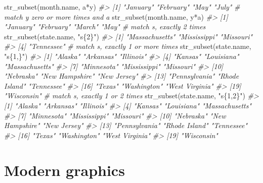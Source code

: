 \documentclass[
]{book}
\newenvironment{Shaded}{\begin{snugshade}}{\end{snugshade}}
\newcommand{\CommentTok}[1]{\textcolor[rgb]{0.56,0.35,0.01}{\textit{#1}}}
\newcommand{\FunctionTok}[1]{\textcolor[rgb]{0.00,0.00,0.00}{#1}}
\newcommand{\NormalTok}[1]{#1}
\newcommand{\StringTok}[1]{\textcolor[rgb]{0.31,0.60,0.02}{#1}}
\begin{document}
\begin{Shaded}
\begin{Highlighting}[]
\FunctionTok{str\_subset}\NormalTok{(month.name, }\StringTok{\textquotesingle{}a*y\textquotesingle{}}\NormalTok{)}
\CommentTok{\#\textgreater{} [1] "January"  "February" "May"      "July"}
\CommentTok{\# match \textquotesingle{}y\textquotesingle{} zero or more times and \textquotesingle{}a\textquotesingle{}}
\FunctionTok{str\_subset}\NormalTok{(month.name, }\StringTok{\textquotesingle{}y*a\textquotesingle{}}\NormalTok{)}
\CommentTok{\#\textgreater{} [1] "January"  "February" "March"    "May"}
\CommentTok{\# match \textquotesingle{}s\textquotesingle{}, exactly 2 times}
\FunctionTok{str\_subset}\NormalTok{(state.name, }\StringTok{"s\{2\}"}\NormalTok{)}
\CommentTok{\#\textgreater{} [1] "Massachusetts" "Mississippi"   "Missouri"     }
\CommentTok{\#\textgreater{} [4] "Tennessee"}
\CommentTok{\# match \textquotesingle{}s\textquotesingle{}, exactly 1 or more times}
\FunctionTok{str\_subset}\NormalTok{(state.name, }\StringTok{"s\{1,\}"}\NormalTok{)}
\CommentTok{\#\textgreater{}  [1] "Alaska"        "Arkansas"      "Illinois"     }
\CommentTok{\#\textgreater{}  [4] "Kansas"        "Louisiana"     "Massachusetts"}
\CommentTok{\#\textgreater{}  [7] "Minnesota"     "Mississippi"   "Missouri"     }
\CommentTok{\#\textgreater{} [10] "Nebraska"      "New Hampshire" "New Jersey"   }
\CommentTok{\#\textgreater{} [13] "Pennsylvania"  "Rhode Island"  "Tennessee"    }
\CommentTok{\#\textgreater{} [16] "Texas"         "Washington"    "West Virginia"}
\CommentTok{\#\textgreater{} [19] "Wisconsin"}
\CommentTok{\# match \textquotesingle{}s\textquotesingle{}, exactly 1 or 2 times}
\FunctionTok{str\_subset}\NormalTok{(state.name, }\StringTok{"s\{1,2\}"}\NormalTok{)}
\CommentTok{\#\textgreater{}  [1] "Alaska"        "Arkansas"      "Illinois"     }
\CommentTok{\#\textgreater{}  [4] "Kansas"        "Louisiana"     "Massachusetts"}
\CommentTok{\#\textgreater{}  [7] "Minnesota"     "Mississippi"   "Missouri"     }
\CommentTok{\#\textgreater{} [10] "Nebraska"      "New Hampshire" "New Jersey"   }
\CommentTok{\#\textgreater{} [13] "Pennsylvania"  "Rhode Island"  "Tennessee"    }
\CommentTok{\#\textgreater{} [16] "Texas"         "Washington"    "West Virginia"}
\CommentTok{\#\textgreater{} [19] "Wisconsin"}
\end{Highlighting}
\end{Shaded}

\hypertarget{modern-graphics}{%
\chapter{Modern graphics}\label{modern-graphics}}
\end{document}
